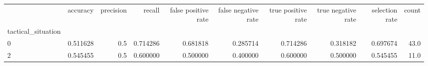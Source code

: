 \begin{tabular}{lrrrrrrrrr}
\toprule
{} &  accuracy &  precision &    recall &  false positive rate &  false negative rate &  true positive rate &  true negative rate &  selection rate &  count \\
tactical\_situation &           &            &           &                      &                      &                     &                     &                 &        \\
\midrule
0                  &  0.511628 &        0.5 &  0.714286 &             0.681818 &             0.285714 &            0.714286 &            0.318182 &        0.697674 &   43.0 \\
2                  &  0.545455 &        0.5 &  0.600000 &             0.500000 &             0.400000 &            0.600000 &            0.500000 &        0.545455 &   11.0 \\
\bottomrule
\end{tabular}
